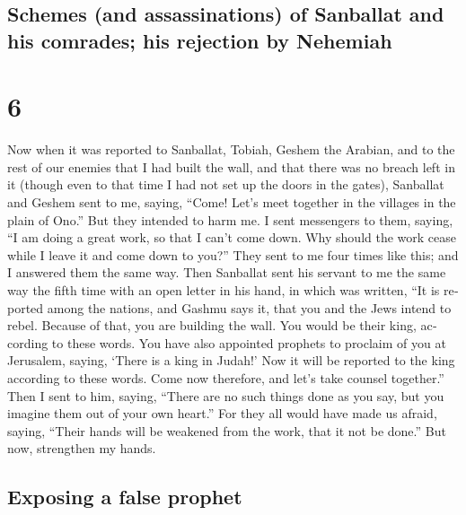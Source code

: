 \begin{paracol}{2}
\switchcolumn
\begin{otherlanguage}{english}

\hypertarget{schemes-and-assassinations-of-sanballat-and-his-comrades-his-rejection-by-nehemiah}{%
\subsection{Schemes (and assassinations) of Sanballat and his comrades;
his rejection by
Nehemiah}\label{schemes-and-assassinations-of-sanballat-and-his-comrades-his-rejection-by-nehemiah}}

\hypertarget{section-11}{%
\section{6}\label{section-11}}

 Now when it was reported to Sanballat, Tobiah, Geshem the
Arabian, and to the rest of our enemies that I had built the wall, and
that there was no breach left in it (though even to that time I had not
set up the doors in the gates),  Sanballat and Geshem sent
to me, saying, ``Come! Let's meet together in the villages in the plain
of Ono.'' But they intended to harm me.  I sent messengers
to them, saying, ``I am doing a great work, so that I can't come down.
Why should the work cease while I leave it and come down to you?''
 They sent to me four times like this; and I answered them
the same way.  Then Sanballat sent his servant to me the
same way the fifth time with an open letter in his hand, 
in which was written, ``It is reported among the nations, and Gashmu
says it, that you and the Jews intend to rebel. Because of that, you are
building the wall. You would be their king, according to these words.
 You have also appointed prophets to proclaim of you at
Jerusalem, saying, `There is a king in Judah!' Now it will be reported
to the king according to these words. Come now therefore, and let's take
counsel together.''  Then I sent to him, saying, ``There
are no such things done as you say, but you imagine them out of your own
heart.''  For they all would have made us afraid, saying,
``Their hands will be weakened from the work, that it not be done.'' But
now, strengthen my hands.

\hypertarget{exposing-a-false-prophet}{%
\subsection{Exposing a false prophet}\label{exposing-a-false-prophet}}


\end{otherlanguage}
\end{paracol}
